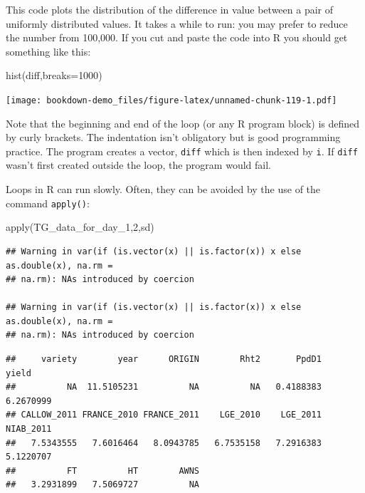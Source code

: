 \documentclass[
]{book}
\newenvironment{Shaded}{\begin{snugshade}}{\end{snugshade}}
\newcommand{\AttributeTok}[1]{\textcolor[rgb]{0.77,0.63,0.00}{#1}}
\newcommand{\DecValTok}[1]{\textcolor[rgb]{0.00,0.00,0.81}{#1}}
\newcommand{\FunctionTok}[1]{\textcolor[rgb]{0.00,0.00,0.00}{#1}}
\newcommand{\NormalTok}[1]{#1}
\begin{document}
This code plots the distribution of the difference in value between a pair of uniformly distributed values. It takes a while to run: you may prefer to reduce the number from 100,000. If you cut and paste the code into R you should get something like this:

\begin{Shaded}
\begin{Highlighting}[]
\FunctionTok{hist}\NormalTok{(diff,}\AttributeTok{breaks=}\DecValTok{1000}\NormalTok{)}
\end{Highlighting}
\end{Shaded}

\texttt{[image: bookdown-demo\_files/figure-latex/unnamed-chunk-119-1.pdf]}

Note that the beginning and end of the loop (or any R program block) is defined by curly brackets. The indentation isn't obligatory but is good programming practice. The program creates a vector, \texttt{diff} which is then indexed by \texttt{i}. If \texttt{diff} wasn't first created outside the loop, the program would fail.

Loops in R can run slowly. Often, they can be avoided by the use of the command \texttt{apply()}:

\begin{Shaded}
\begin{Highlighting}[]
\FunctionTok{apply}\NormalTok{(TG\_data\_for\_day\_1,}\DecValTok{2}\NormalTok{,sd)}
\end{Highlighting}
\end{Shaded}

\begin{verbatim}
## Warning in var(if (is.vector(x) || is.factor(x)) x else as.double(x), na.rm =
## na.rm): NAs introduced by coercion

## Warning in var(if (is.vector(x) || is.factor(x)) x else as.double(x), na.rm =
## na.rm): NAs introduced by coercion
\end{verbatim}

\begin{verbatim}
##     variety        year      ORIGIN        Rht2       PpdD1       yield 
##          NA  11.5105231          NA          NA   0.4188383   6.2670999 
## CALLOW_2011 FRANCE_2010 FRANCE_2011    LGE_2010    LGE_2011   NIAB_2011 
##   7.5343555   7.6016464   8.0943785   6.7535158   7.2916383   5.1220707 
##          FT          HT        AWNS 
##   3.2931899   7.5069727          NA
\end{verbatim}
\end{document}
